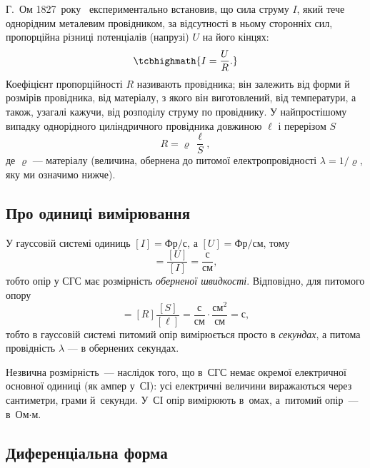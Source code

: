 Г.~Ом 1827~року~\cite{Ohm1827} експериментально встановив, що сила струму $I$, який тече однорідним металевим провідником, за відсутності в ньому сторонніх сил,
пропорційна різниці потенціалів (напрузі) $U$ на його кінцях:
\begin{equation}\label{eq:OhmIntegral}
	\tcbhighmath{
		I = \frac{U}{R}.
	}
\end{equation}
Коефіцієнт пропорційності $R$ називають  провідника; він залежить від форми й розмірів провідника, від матеріалу, з якого
він виготовлений, від температури, а також, узагалі кажучи, від розподілу струму по провіднику. У найпростішому випадку однорідного циліндричного
провідника довжиною $\ell$ і перерізом $S$
\begin{equation}\label{eq:ResistanceCylinder}
	R = \varrho\, \frac{\ell}{S},
\end{equation}
де $\varrho$ ---  матеріалу (величина, обернена до питомої електропровідності $\lambda = 1/\varrho$, яку ми означимо нижче).

\subsection*{Про одиниці вимірювання}

У гауссовій системі одиниць $[I] = \text{Фр}/\text{с}$, а $[U] = \text{Фр}/\text{см}$, тому
\begin{equation*}
	[R] = \frac{[U]}{[I]} = \frac{\text{с}}{\text{см}},
\end{equation*}
тобто опір у СГС має розмірність \emph{оберненої швидкості}. Відповідно, для питомого опору
\begin{equation*}
	[\varrho] = [R]\frac{[S]}{[\ell]} = \frac{\text{с}}{\text{см}}\cdot\frac{\text{см}^2}{\text{см}} = \text{с},
\end{equation*}
тобто в гауссовій системі питомий опір вимірюється просто в \emph{секундах}, а питома провідність $\lambda$ --- в обернених секундах.

Незвична розмірність~--- наслідок того, що в~СГС немає окремої електричної основної
одиниці (як ампер у~СІ): усі електричні величини виражаються через сантиметри, грами
й~секунди. У~СІ опір вимірюють в~омах, а~питомий опір~--- в~Ом$\cdot$м.

\subsection*{Диференціальна форма}

